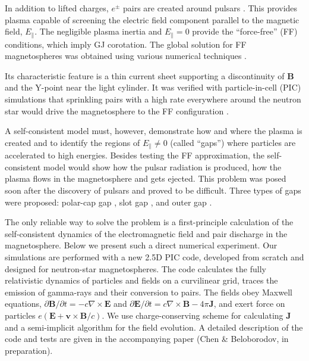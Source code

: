 In addition to lifted charges, $e^\pm$ pairs are created around pulsars
\citep{sturrock_model_1971}.
This provides plasma capable of
screening the electric field component parallel to the magnetic field, $E_\parallel$.
The negligible plasma inertia and $E_\parallel=0$ provide the ``force-free'' (FF)
conditions, which imply GJ corotation.
The global solution for FF magnetospheres was obtained
using various numerical techniques
\citep{contopoulos_axisymmetric_1999,timokhin_force-free_2006,spitkovsky_time-dependent_2006,kalapotharakos_three-dimensional_2009,parfrey_introducing_2012}.

Its characteristic feature is a thin current sheet supporting
a discontinuity of $\mathbf{B}$ and the Y-point near the light cylinder.
It was verified with particle-in-cell (PIC) simulations that
sprinkling pairs with a high rate everywhere around the neutron star
would drive the magnetosphere to the FF configuration \citep{philippov_ab_2014}.

A self-consistent model must, however, demonstrate how and where the plasma is
created and to identify the regions of $E_\parallel\neq 0$ (called ``gaps'')
where particles are accelerated to high energies. Besides testing the FF
approximation, the self-consistent model would show how the pulsar
radiation is produced, how the plasma flows in the magnetosphere and gets ejected.
This problem was posed soon after the discovery of pulsars and proved to be difficult.
Three types of gaps were proposed: polar-cap gap
\citep{sturrock_model_1971,ruderman_theory_1975}, slot gap
\citep{arons_pair_1983, muslimov_high-altitude_2004},
and outer gap
\citep{cheng_energetic_1986}.

The only reliable way to solve the problem is a first-principle calculation of the
self-consistent dynamics of the electromagnetic field and pair discharge in the
magnetosphere. Below we present such a direct numerical experiment.
Our simulations are performed with a new 2.5D PIC code, developed from
scratch and designed for neutron-star magnetospheres.
The code calculates the fully relativistic dynamics of particles and fields
on a curvilinear grid, traces the emission of gamma-rays and their conversion to pairs.
The fields obey Maxwell equations, $\partial\mathbf{B}/\partial t=-c\nabla\times\mathbf{E}$ and
$\partial\mathbf{E}/\partial t=c\nabla\times\mathbf{B} - 4\pi\mathbf{J}$, and exert force on particles
$e(\mathbf{E}+\mathbf{v}\times\mathbf{B}/c)$. We use
\citet{esirkepov_exact_2001}
charge-conserving scheme for calculating $\mathbf{J}$
and a semi-implicit algorithm for the field evolution.
A detailed description of the code and tests are given in the accompanying paper
(Chen \& Beloborodov, in preparation).


